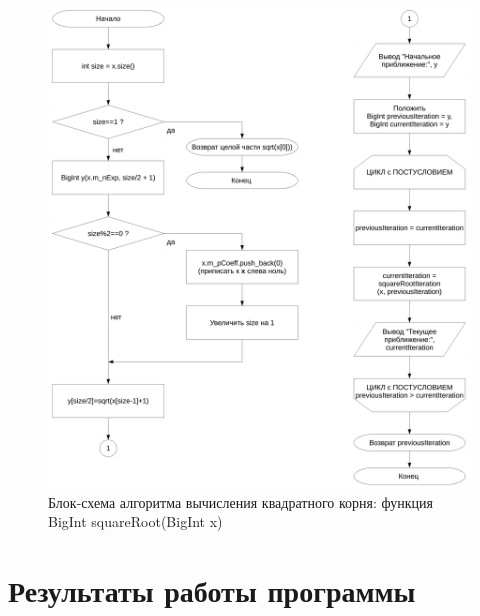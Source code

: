 \documentclass[a4paper,12pt]{article} %
\begin{document}
\begin{figure}[ht]
	\includegraphics[width=\textwidth]{lr6_squareRoot.pdf}
	\caption{Блок-схема алгоритма вычисления квадратного корня: функция BigInt squareRoot(BigInt x)}
	\label{bs_square_root}
\end{figure}


\clearpage

\section*{Результаты работы программы}
\end{document}
